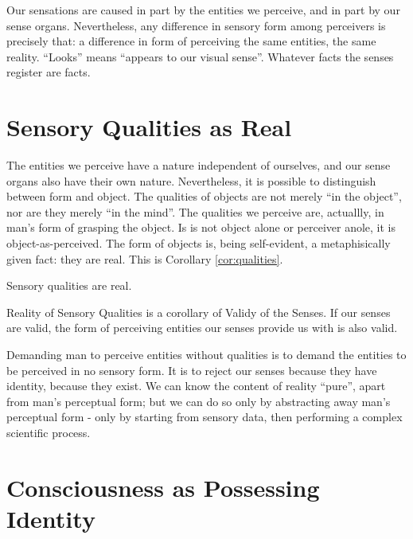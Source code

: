         Our sensations are caused in part by the entities we perceive, and in part by our sense organs. Nevertheless, any difference in sensory form among perceivers is precisely that: a difference in form of perceiving the same entities, the same reality. ``Looks'' means ``appears to our visual sense''. Whatever facts the senses register are facts.
    
    \section{Sensory Qualities as Real}
        
        The entities we perceive have a nature independent of ourselves, and our sense organs also have their own nature. Nevertheless, it is possible to distinguish between form and object. The qualities of objects are not merely ``in the object'', nor are they merely ``in the mind''. The qualities we perceive are, actuallly, in man's form of grasping the object. Is is not object alone or perceiver anole, it is object-as-perceived. The form of objects is, being self-evident, a metaphisically given fact: they are real. This is Corollary \ref{cor:qualities}.

            \begin{corollary}
            \label{cor:qualities}
                Sensory qualities are real.
            \end{corollary}

            \begin{remark}
                Reality of Sensory Qualities is a corollary of Validy of the Senses. If our senses are valid, the form of perceiving entities our senses provide us with is also valid.
            \end{remark}

        Demanding man to perceive entities without qualities is to demand the entities to be perceived in no sensory form. It is to reject our senses because they have identity, because they exist. We can know the content of reality ``pure'', apart from man's perceptual form; but we can do so only by abstracting away man's perceptual form - only by starting from sensory data, then performing a complex scientific process.
    
    \section{Consciousness as Possessing Identity}


